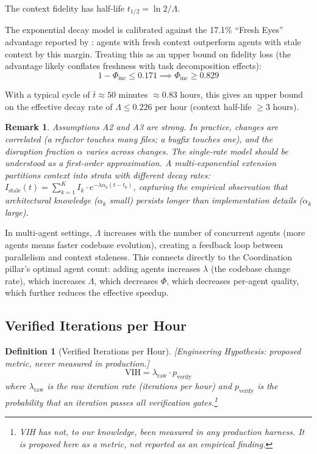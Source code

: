 \documentclass[11pt, a4paper, logo, copyright]{googledeepmind}
\newtheorem{definition}{Definition}[section]
\newtheorem*{remark}{Remark}
\begin{document}
The context fidelity has half-life $t_{1/2} = \ln 2 / \Lambda$.

The exponential decay model is calibrated against the 17.1\% ``Fresh Eyes'' advantage reported by \citet{suzgun2024metaprompting}: agents with fresh context outperform agents with stale context by this margin. Treating this as an upper bound on fidelity loss (the advantage likely conflates freshness with task decomposition effects):
\begin{equation}
    1 - \Phi_{\mathrm{inc}} \leq 0.171 \implies \Phi_{\mathrm{inc}} \geq 0.829
\end{equation}

With a typical cycle of $\bar{t} \approx 50$ minutes $\approx 0.83$ hours, this gives an upper bound on the effective decay rate of $\Lambda \leq 0.226$ per hour (context half-life $\geq 3$ hours).

\begin{remark}
Assumptions A2 and A3 are strong. In practice, changes are correlated (a refactor touches many files; a bugfix touches one), and the disruption fraction $\alpha$ varies across changes. The single-rate model should be understood as a first-order approximation. A multi-exponential extension partitions context into strata with different decay rates: $I_{\mathrm{stale}}(t) = \sum_{k=1}^K I_k \cdot e^{-\lambda\alpha_k(t - t_0)}$, capturing the empirical observation that architectural knowledge ($\alpha_k$ small) persists longer than implementation details ($\alpha_k$ large).
\end{remark}

In multi-agent settings, $\Lambda$ increases with the number of concurrent agents (more agents means faster codebase evolution), creating a feedback loop between parallelism and context staleness. This connects directly to the Coordination pillar's optimal agent count: adding agents increases $\lambda$ (the codebase change rate), which increases $\Lambda$, which decreases $\Phi$, which decreases per-agent quality, which further reduces the effective speedup.

\subsection{Verified Iterations per Hour}

\begin{definition}[Verified Iterations per Hour]
\emph{[Engineering Hypothesis: proposed metric, never measured in production.]}
\label{def:vih}
\begin{equation}
    \text{VIH} = \lambda_{\text{raw}} \cdot p_{\text{verify}}
\end{equation}
where $\lambda_{\text{raw}}$ is the raw iteration rate (iterations per hour) and $p_{\text{verify}}$ is the probability that an iteration passes all verification gates.\footnote{VIH has not, to our knowledge, been measured in any production harness. It is proposed here as a metric, not reported as an empirical finding.}
\end{definition}
\end{document}
